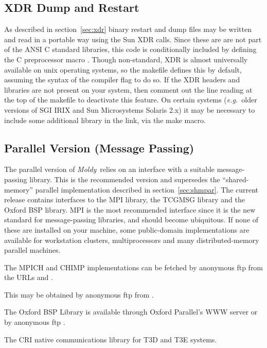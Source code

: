 \documentclass[a4paper,twoside]{report}
\newcommand{\moldy}{\emph{Moldy}}
\newcommand{\eg}{\emph{e.g.}}
\begin{document}
\subsection{XDR Dump and Restart}
As described in section~\ref{sec:xdr} binary restart and dump files
may be written and read in a portable way using the Sun XDR calls.
Since these are are not part of the ANSI C standard libraries, this
code is conditionally included by defining the C preprocessor macro
.  Though non-standard, XDR is almost universally
available on unix operating systems, so the makefile defines this by
default, assuming the syntax of the compiler flag 
to do so.  If the XDR headers and libraries are not present on your
system, then comment out the line reading  at
the top of the makefile to deactivate this feature.  On certain
systems (\eg\ older versions of SGI IRIX and Sun Microsystems Solaris
2.x) it may be necessary to include some additional library in the
link, via the  make macro.

\subsection{Parallel Version (Message Passing)}
\label{sec:spmdpar}
The parallel version of \moldy\ relies on an interface with a suitable
message-passing library.  This is the recommended version and
supersedes the ``shared-memory'' parallel implementation described in
section~\ref{sec:shmpar}.  The current release contains interfaces to
the MPI library\cite{mpi:94}, the TCGMSG library and the Oxford BSP
library.  MPI is the most recommended interface since it is the new
standard for message-passing libraries, and should become ubiquitous.
If none of these are installed on your machine, some public-domain
implementations are available for workstation clusters,
multiprocessors and many distributed-memory parallel machines.

\begin{description}
\raggedright
\item[MPI] The MPICH and CHIMP implementations can be fetched by
  anonymous ftp from the URLs 
   and
  .
\item[TCGMSG] This may be obtained by anonymous ftp from
  .
\item[BSP] The Oxford BSP Library is available through Oxford
  Parallel's WWW server
  or by anonymous ftp
  .
\item[SHMEM] The CRI native communications library for T3D and T3E
  systems.
\end{description}
\end{document}
